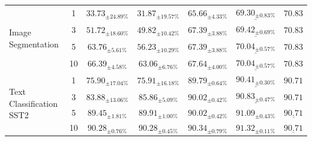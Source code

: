 \documentclass{article}
\begin{document}
\begin{longtable}{@{}p{}cccccc@{}}
\midrule
\multirow{4}{=}{Image Segmentation} 
& 1 & $33.73_{\pm24.89\%}$ & $31.87_{\pm19.57\%}$  & $65.66_{\pm4.33\%}$ & $\underline{69.30_{\pm0.83\%}}$ & $\mathbf{70.83}$\\
& 3 & $51.72_{\pm18.60\%}$ & $49.82_{\pm10.42\%}$  & $67.39_{\pm3.88\%}$ & $\underline{69.42_{\pm0.69\%}}$ & $\mathbf{70.83}$\\
& 5 & $63.76_{\pm5.61\%}$ & $56.23_{\pm10.29\%}$  & $67.39_{\pm3.88\%}$ & $\underline{70.04_{\pm0.57\%}}$ & $\mathbf{70.83}$\\
& 10 & $66.39_{\pm4.58\%}$ & $63.06_{\pm6.76\%}$  & $67.64_{\pm4.00\%}$ & $\underline{70.04_{\pm0.57\%}}$ & $\mathbf{70.83}$\\

\midrule
\multirow{4}{=}{Text Classification SST2} 
& 1 & $75.90_{\pm17.04\%}$ & $75.91_{\pm16.18\%}$  & $89.79_{\pm0.64\%}$ & $\underline{90.41_{\pm0.30\%}}$ & $\mathbf{90.71}$ \\
& 3 & $83.88_{\pm13.06\%}$ & $85.86_{\pm5.09\%}$  & $90.02_{\pm0.42\%}$ & $\underline{90.83_{\pm0.47\%}}$ & $\mathbf{90.71}$ \\
& 5 & $89.45_{\pm1.81\%}$ & $89.91_{\pm1.00\%}$  & $90.02_{\pm0.42\%}$  & $\mathbf{91.09_{\pm0.43\%}}$ & $\underline{90.71}$ \\
& 10 & $90.28_{\pm0.76\%}$ & $90.28_{\pm0.45\%}$  & $90.34_{\pm0.79\%}$ & $\mathbf{91.32_{\pm0.11\%}}$ & $\underline{90.71}$ \\


\end{longtable}
\end{document}
